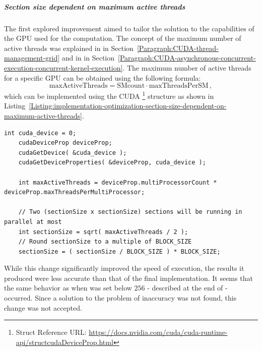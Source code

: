 \subparagraph{Section size dependent on maximum active threads}\label{Subparagraph:implementation-optimization-section-size-dependent-on-maximum-active-threads}
The first explored improvement aimed to tailor the solution to the capabilities of the GPU used for the computation. The concept of the maximum number of active threads was explained in \textit{} in Section~\ref{Paragraph:CUDA-thread-management-grid} and in \textit{} in Section~\ref{Paragraph:CUDA-asynchronous-concurrent-execution-concurrent-kernel-execution}. The maximum number of active threads for a specific GPU can be obtained using the following formula:
\begin{equation}
	\mathrm{maxActiveThreads} = \mathrm{SMcount}\cdot \mathrm{maxThreadsPerSM} \nonumber\,,
\end{equation}
which can be implemented using the CUDA \footnote{ Struct Reference URL: \url{https://docs.nvidia.com/cuda/cuda-runtime-api/structcudaDeviceProp.html}} structure as shown in Listing~\ref{Listing:implementation-optimization-section-size-dependent-on-maximum-active-threads}.

\begin{lstlisting}[caption={Code detailing the calculation of the size of a section based on the the maximum number of active threads for a given GPU. The structure \code{cudaDeviceProp} contains properties and information about the given CUDA device. Taken from the Decomposition project repository on GitLab\protect\footref{Footnote:decomposition-project-gitlab-url}.},label={Listing:implementation-optimization-section-size-dependent-on-maximum-active-threads},escapechar=@]
	int cuda_device = 0;
	cudaDeviceProp deviceProp;
	cudaGetDevice( &cuda_device );
	cudaGetDeviceProperties( &deviceProp, cuda_device );
	
	int maxActiveThreads = deviceProp.multiProcessorCount * deviceProp.maxThreadsPerMultiProcessor;
	
	// Two (sectionSize x sectionSize) sections will be running in parallel at most
	int sectionSize = sqrt( maxActiveThreads / 2 );
	// Round sectionSize to a multiple of BLOCK_SIZE
	sectionSize = ( sectionSize / BLOCK_SIZE ) * BLOCK_SIZE;
\end{lstlisting}

While this change significantly improved the speed of execution, the results it produced were less accurate than that of the final implementation. It seems that the same behavior as when  was set below $ 256 $ - described at the end of \textit{} - occurred. Since a solution to the problem of inaccuracy was not found, this change was not accepted.

